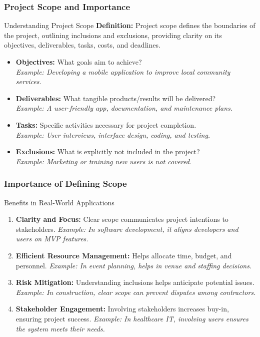\documentclass[aspectratio=169]{beamer}
\begin{document}
\begin{frame}[fragile]
    \frametitle{Project Scope and Importance}
    \begin{block}{Understanding Project Scope}
        \textbf{Definition:} Project scope defines the boundaries of the project, outlining inclusions and exclusions, providing clarity on its objectives, deliverables, tasks, costs, and deadlines.
    \end{block}
    
    \begin{itemize}
        \item \textbf{Objectives:} What goals aim to achieve? \\
            \textit{Example: Developing a mobile application to improve local community services.}
        \item \textbf{Deliverables:} What tangible products/results will be delivered? \\
            \textit{Example: A user-friendly app, documentation, and maintenance plans.}
        \item \textbf{Tasks:} Specific activities necessary for project completion. \\
            \textit{Example: User interviews, interface design, coding, and testing.}
        \item \textbf{Exclusions:} What is explicitly not included in the project? \\
            \textit{Example: Marketing or training new users is not covered.}
    \end{itemize}
\end{frame}

\begin{frame}[fragile]
    \frametitle{Importance of Defining Scope}
    \begin{block}{Benefits in Real-World Applications}
        \begin{enumerate}
            \item \textbf{Clarity and Focus:}
                Clear scope communicates project intentions to stakeholders.
                \textit{Example: In software development, it aligns developers and users on MVP features.}
        
            \item \textbf{Efficient Resource Management:}
                Helps allocate time, budget, and personnel.
                \textit{Example: In event planning, helps in venue and staffing decisions.}
        
            \item \textbf{Risk Mitigation:}
                Understanding inclusions helps anticipate potential issues.
                \textit{Example: In construction, clear scope can prevent disputes among contractors.}
        
            \item \textbf{Stakeholder Engagement:}
                Involving stakeholders increases buy-in, ensuring project success.
                \textit{Example: In healthcare IT, involving users ensures the system meets their needs.}
        \end{enumerate}
    \end{block}
\end{frame}
\end{document}
